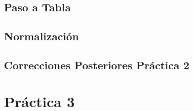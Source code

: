 \documentclass[twoside,openright,titlepage,numbers=noenddot,headinclude,footinclude=true,
cleardoublepage=empty,abstractoff,BCOR=5mm,paper=a4,fontsize=12pt,main=spanish,pdfstartpage=1]{scrreprt}
\theoremstyle{plain}
\begin{document}
\chapter{Paso a Tabla}


\chapter{Normalización}


\chapter{Correcciones Posteriores Práctica 2}



\part{Práctica 3}











%

\end{document}
